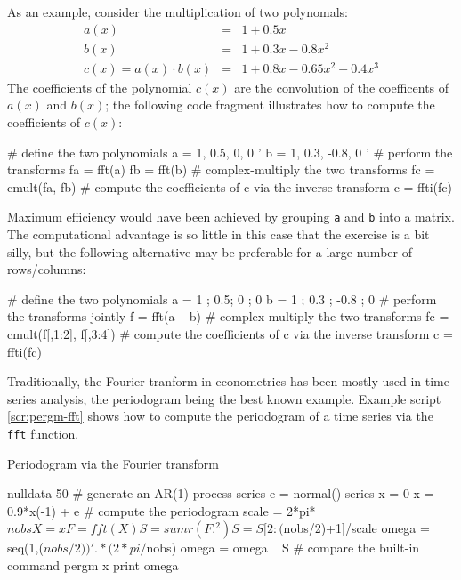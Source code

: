 As an example, consider the multiplication of two polynomals:
\begin{eqnarray*}
  a(x) & = & 1 + 0.5 x \\
  b(x) & = & 1 + 0.3 x - 0.8 x^2 \\
  c(x) = a(x) \cdot b(x) & = & 1 + 0.8 x - 0.65 x^2 - 0.4 x^3
\end{eqnarray*}
The coefficients of the polynomial $c(x)$ are the convolution of the
coefficents of $a(x)$ and $b(x)$; the following  code fragment
illustrates how to compute the coefficients of $c(x)$:
\begin{code}
# define the two polynomials
a = { 1, 0.5, 0, 0 }'
b = { 1, 0.3, -0.8, 0 }'
# perform the transforms
fa = fft(a)
fb = fft(b)
# complex-multiply the two transforms 
fc = cmult(fa, fb)
# compute the coefficients of c via the inverse transform
c = ffti(fc)
\end{code}

Maximum efficiency would have been achieved by grouping \texttt{a} and
\texttt{b} into a matrix.  The computational advantage is so little in
this case that the exercise is a bit silly, but the following
alternative may be preferable for a large number of
rows/columns:
\begin{code}
# define the two polynomials
a = { 1 ; 0.5; 0 ; 0 }
b = { 1 ; 0.3 ; -0.8 ; 0 }
# perform the transforms jointly
f = fft(a ~ b)
# complex-multiply the two transforms 
fc = cmult(f[,1:2], f[,3:4])
# compute the coefficients of c via the inverse transform
c = ffti(fc)
\end{code}

Traditionally, the Fourier tranform in econometrics has been mostly
used in time-series analysis, the periodogram being the best known
example. Example script \ref{scr:pergm-fft} shows how to compute the
periodogram of a time series via the \texttt{fft} function.

\begin{script}[htbp]
  \caption{Periodogram via the Fourier transform}
  \label{scr:pergm-fft}
\begin{scode}
nulldata 50
# generate an AR(1) process
series e = normal()
series x = 0
x = 0.9*x(-1) + e
# compute the periodogram
scale = 2*pi*$nobs
X = { x }
F = fft(X)
S = sumr(F.^2)
S = S[2:($nobs/2)+1]/scale
omega = seq(1,($nobs/2))' .* (2*pi/$nobs)
omega = omega ~ S
# compare the built-in command
pergm x  
print omega
\end{scode}
\end{script}


